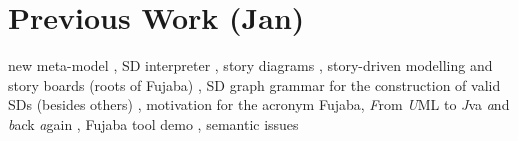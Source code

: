 \section{Previous Work (Jan)}

new meta-model \cite{HRvD+11},
SD interpreter \cite{GHS09},
story diagrams \cite{FNTZ00,Zun01},
story-driven modelling and story boards (roots of Fujaba) \cite{ZSW99,FNT98,DGZ04},
SD graph grammar for the construction of valid SDs (besides others) \cite{Kle99},
motivation for the acronym Fujaba, \textit{F}rom \textit{U}ML to \textit{J}va \textit{a}nd \textit{b}ack \textit{a}gain \cite{JZ97},
Fujaba tool demo \cite{NNZ00},
semantic issues \cite{TMG06}
